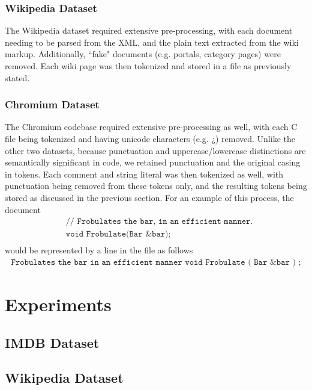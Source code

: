 \documentclass[11pt]{article}
\newcommand{\CPP}
{C\nolinebreak[4]\hspace{-.05em}\raisebox{.22ex}{\footnotesize\bf ++\ }}
\begin{document}
\subsubsection*{Wikipedia Dataset}
The Wikipedia dataset required extensive pre-processing, with each document
needing to be parsed from the XML, and the plain text extracted from the wiki
markup. Additionally, ``fake" documents (e.g. portals, category pages) were
removed. Each wiki page was then tokenized and stored in a file as previously
stated.

\subsubsection*{Chromium Dataset}
The Chromium codebase required extensive pre-processing as well, with each \CPP
file being tokenized and having unicode characters (e.g. ¿) removed.
Unlike the other two datasets, because punctuation and uppercase/lowercase
distinctions are semantically significant in code, we retained punctuation and
the original casing in tokens.
Each comment and string literal was then tokenized as well, with punctuation
being removed from these tokens only, and the resulting tokens being stored as
discussed in the previous section. For an example of this process, the
document
\begin{align*}
&\texttt{// Frobulates the bar, in an efficient manner.}\\
&\texttt{void Frobulate(Bar \&bar);}\\
\end{align*}
would be represented by a line in the file as follows\\
\begin{align*}
\texttt{Frobulates the bar in an efficient manner void Frobulate ( Bar \& bar ) ;}
\end{align*}


\section*{Experiments}

\subsection*{IMDB Dataset}

\subsection*{Wikipedia Dataset}
\end{document}
